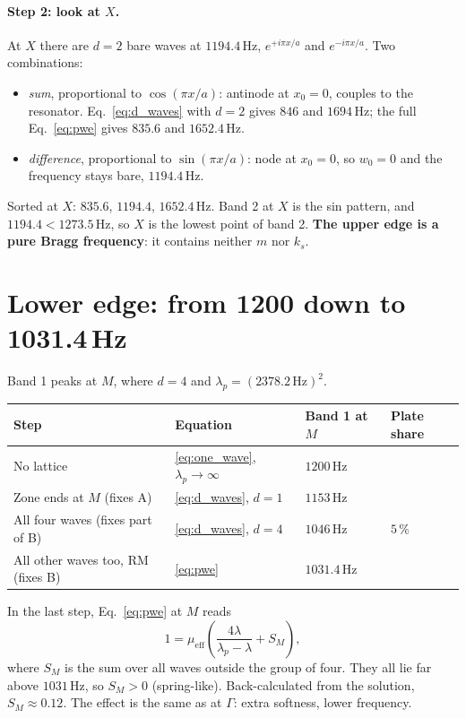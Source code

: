 \paragraph{Step 2: look at $X$.}
At $X$ there are $d=2$ bare waves at $1194.4\,\mathrm{Hz}$,
$e^{+i\pi x/a}$ and $e^{-i\pi x/a}$. Two combinations:
\begin{itemize}
  \item \emph{sum}, proportional to $\cos(\pi x/a)$: antinode at $x_0 = 0$,
        couples to the resonator. Eq.~\eqref{eq:d_waves} with $d=2$ gives
        $846$ and $1694\,\mathrm{Hz}$; the full Eq.~\eqref{eq:pwe} gives
        $835.6$ and $1652.4\,\mathrm{Hz}$.
  \item \emph{difference}, proportional to $\sin(\pi x/a)$: node at $x_0 = 0$,
        so $w_0 = 0$ and the frequency stays bare, $1194.4\,\mathrm{Hz}$.
\end{itemize}
Sorted at $X$: $835.6$, $\mathbf{1194.4}$, $1652.4\,\mathrm{Hz}$. Band 2 at $X$ is
the sin pattern, and $1194.4 < 1273.5\,\mathrm{Hz}$, so $X$ is the lowest point
of band 2. \textbf{The upper edge is a pure Bragg frequency}: it contains neither
$m$ nor $k_s$.

\section{Lower edge: from 1200 down to 1031.4\,Hz}

Band 1 peaks at $M$, where $d = 4$ and $\lambda_p = (2378.2\,\mathrm{Hz})^2$.
\begin{center}
\begin{tabular}{|p{}|l|l|p{}|}
\hline
Step & Equation & Band 1 at $M$ & Plate share \\
\hline
No lattice & \eqref{eq:one_wave}, $\lambda_p\to\infty$ & $1200\,\mathrm{Hz}$ & \\
Zone ends at $M$ (fixes A) & \eqref{eq:d_waves}, $d=1$ & $1153\,\mathrm{Hz}$ & \\
All four waves (fixes part of B) & \eqref{eq:d_waves}, $d=4$ & $1046\,\mathrm{Hz}$ & $5\,\%$ \\
All other waves too, RM (fixes B) & \eqref{eq:pwe} & $1031.4\,\mathrm{Hz}$ & \\
\hline
\end{tabular}
\end{center}
In the last step, Eq.~\eqref{eq:pwe} at $M$ reads
\begin{equation}
  1 = \mu_\mathrm{eff}\left(\frac{4\lambda}{\lambda_p - \lambda} + S_M\right) ,
\end{equation}
where $S_M$ is the sum over all waves outside the group of four. They all lie far
above $1031\,\mathrm{Hz}$, so $S_M > 0$ (spring-like). Back-calculated from the
solution, $S_M \approx 0.12$. The effect is the same as at $\Gamma$: extra
softness, lower frequency.

